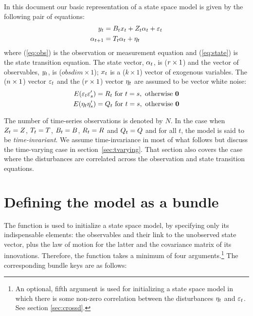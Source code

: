 In this document our basic representation of a state space model is
given by the following pair of equations:
%
\begin{align}
  \label{eq:obs}
  y_t &= B_tx_t + Z_t \alpha_t +
  \varepsilon_t \\
  \label{eq:state}
  \alpha_{t+1} &= T_t \alpha_t + \eta_t
\end{align}
%
where (\ref{eq:obs}) is the observation or measurement equation and
(\ref{eq:state}) is the state transition equation.  The state vector,
$\alpha_{t}$, is ($r \times 1$) and the vector of observables,
$y_t$, is ($obsdim \times 1$); $x_t$ is a ($k \times 1$)
vector of exogenous variables.  The ($n \times 1$) vector
$\varepsilon_t$ and the ($r \times 1$) vector $\eta_t$ are
assumed to be vector white noise:
%
\begin{align*}
E(\varepsilon_t \varepsilon_s') &= R_t \mbox{ for } t = s,
    \mbox{ otherwise } \mathbf{0} \\
E(\eta_t \eta_s') &= Q_t \mbox{ for } t = s,
    \mbox{ otherwise } \mathbf{0}
\end{align*}

The number of time-series observations is denoted by $N$.  In the case
when $Z_t = Z$, $T_t = T$,
$B_t = B$, $R_t = R$ and
$Q_t = Q$ and for all $t$, the model is said to be
\emph{time-invariant}. We assume time-invariance in most of what
follows but discuss the time-varying case in
section~\ref{sec:tvarying}. That section also covers the case where
the disturbances are correlated across the observation and state
transition equations.

\section{Defining the model as a bundle}
\label{sec:setup}

The  function is used to initialize a state space model,
by specifying only its indispensable elements: the observables and
their link to the unobserved state vector, plus the law of motion for
the latter and the covariance matrix of its innovations. Therefore,
the function takes a minimum of four arguments.\footnote{An optional,
  fifth argument is used for initializing a state space model in which
  there is some non-zero correlation between the disturbances
  $\eta_t$ and $\varepsilon_t$. See section \ref{sec:crossd}.} The
corresponding bundle keys are as follows:

